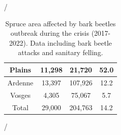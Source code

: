 \documentclass[3p,procedia]{elsarticle}
\begin{document}
/%
\begin{table}[htbp]
	\caption{Spruce area affected by bark beetles outbreak during the crisis (2017-2022). Data including bark beetle attacks and sanitary felling.}
	\label{tab_recap}
	\begin{tabular}{|c|c|c|c|}
		\hline
		Plains  & 11,298                                                                                     & 21,720                                                                          & 52.0                                                                       \\ \hline
		Ardenne & 13,397                                                                                     & 107,926                                                                         & 12.2                                                                       \\ \hline
		Vosges  & 4,305                                                                                      & 75,067                                                                          & 5.7                                                                        \\ \hline
		Total   & 29,000                                                                                     & 204,763                                                                         & 14.2                                                                       \\ \hline
	\end{tabular}
\end{table}
/%
\end{document}
